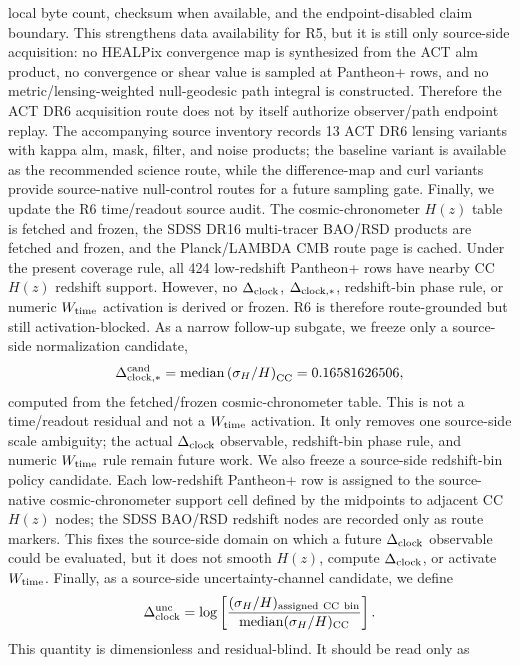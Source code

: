 \documentclass[11pt]{article}
\begin{document}
local byte count, checksum when available, and the endpoint-disabled claim
boundary.  This strengthens data availability for R5, but it is still only
source-side acquisition: no HEALPix convergence map is synthesized from the ACT
alm product, no convergence or shear value is sampled at Pantheon+ rows, and no
metric/lensing-weighted null-geodesic path integral is constructed.  Therefore
the ACT DR6 acquisition route does not by itself authorize observer/path
endpoint replay.  The accompanying source inventory records 13 ACT DR6 lensing
variants with kappa alm, mask, filter, and noise products; the baseline variant
is available as the recommended science route, while the difference-map and curl
variants provide source-native null-control routes for a future sampling gate.
Finally, we update the R6 time/readout source audit.  The cosmic-chronometer
\(H(z)\) table is fetched and frozen, the SDSS DR16 multi-tracer BAO/RSD
products are fetched and frozen, and the Planck/LAMBDA CMB route page is
cached.  Under the present coverage rule, all 424 low-redshift Pantheon+ rows
have nearby CC \(H(z)\) redshift support.  However, no \(\Delta_{\rm clock}\),
\(\Delta_{\rm clock,\ast}\), redshift-bin phase rule, or numeric \(W_{\rm time}\)
activation is derived or frozen.  R6 is therefore route-grounded but still
activation-blocked.
As a narrow follow-up subgate, we freeze only a source-side normalization
candidate,
\[
\Delta_{\rm clock,\ast}^{\rm cand}
  = {\rm median}\left(\sigma_H/H\right)_{\rm CC}
  = 0.16581626506,
\]
computed from the fetched/frozen cosmic-chronometer table.  This is not a
time/readout residual and not a \(W_{\rm time}\) activation.  It only removes
one source-side scale ambiguity; the actual \(\Delta_{\rm clock}\) observable,
redshift-bin phase rule, and numeric \(W_{\rm time}\) rule remain future work.
We also freeze a source-side redshift-bin policy candidate.  Each low-redshift
Pantheon+ row is assigned to the source-native cosmic-chronometer support cell
defined by the midpoints to adjacent CC \(H(z)\) nodes; the SDSS BAO/RSD
redshift nodes are recorded only as route markers.  This fixes the
source-side domain on which a future \(\Delta_{\rm clock}\) observable could be
evaluated, but it does not smooth \(H(z)\), compute \(\Delta_{\rm clock}\), or
activate \(W_{\rm time}\).
Finally, as a source-side uncertainty-channel candidate, we define
\[
\Delta_{\rm clock}^{\rm unc}
  =
  \log\left[
    \frac{(\sigma_H/H)_{\rm assigned\ CC\ bin}}
         {{\rm median}(\sigma_H/H)_{\rm CC}}
  \right].
\]
This quantity is dimensionless and residual-blind.  It should be read only as
\end{document}
